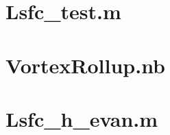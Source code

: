 \documentclass[letter,10pt]{article}
\begin{document}
\section{Lsfc\_test.m}
\label{app:Lsfc_test.m}
\clearpage

\section{VortexRollup.nb}
\label{app:VortexRollup.nb}

\clearpage

\section{Lsfc\_h\_evan.m}
\label{app:Lsfc_h_evan.m}
\clearpage
\end{document}

